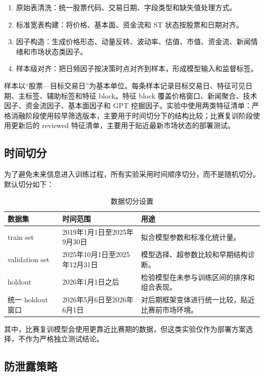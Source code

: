 \documentclass[UTF8,a4paper,12pt,fontset=none]{ctexart}
\begin{document}
\begin{enumerate}
  \item 原始表清洗：统一股票代码、交易日期、字段类型和缺失值处理方式。
  \item 标准宽表构建：将价格、基本面、资金流和 ST 状态按股票和日期对齐。
  \item 因子构造：生成价格形态、动量反转、波动率、估值、市值、资金流、新闻情绪和市场状态类因子。
  \item 样本级对齐：把日频因子按决策时点对齐到样本，形成模型输入和监督标签。
\end{enumerate}

样本以“股票—目标交易日”为基本单位。每条样本记录目标交易日、特征可见日期、主标签、辅助标签和特征 block。特征 block 覆盖价格窗口、新闻聚合、技术因子、资金流因子、基本面因子和 GPT 挖掘因子。实验中使用两类特征清单：严格消融阶段使用较早筛选版本，主要用于时间切分下的结构比较；比赛复训阶段使用更新后的 reviewed 特征清单，主要用于贴近最新市场状态的部署测试。

\subsection{时间切分}

为了避免未来信息进入训练过程，所有实验采用时间顺序切分，而不是随机切分。默认切分如下：

\begin{table}[H]
  \centering
  \caption{数据切分设置}
  \begin{tabularx}{\textwidth}{L{0.22\textwidth}L{0.28\textwidth}Y}
    \toprule
    数据集 & 时间范围 & 用途 \\
    \midrule
    train set & 2019年1月1日至2025年9月30日 & 拟合模型参数和标准化统计量。 \\
    validation set & 2025年10月1日至2025年12月31日 & 模型选择、超参数比较和早期结构诊断。 \\
    holdout & 2026年1月1日之后 & 检验模型在未参与训练区间的排序和组合表现。 \\
    统一 holdout 窗口 & 2026年5月6日至2026年6月1日 & 对后期框架变体进行统一比较，贴近比赛前市场环境。 \\
    \bottomrule
  \end{tabularx}
\end{table}

其中，比赛复训模型会使用更靠近比赛期的数据，但这类实验仅作为部署方案选择，不作为严格独立测试结论。

\subsection{防泄露策略}
\end{document}
